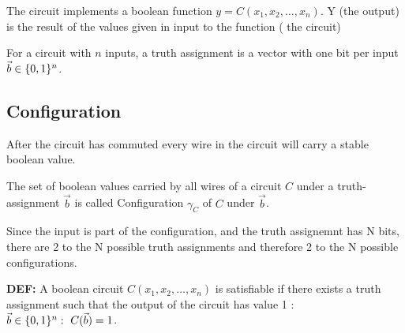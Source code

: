The circuit implements a boolean function $y=C(x_1,x_2,\ldots,x_n)$.
Y (the output) is the result of the values given in input to the function ( the circuit) 

\begin{notesdefinition}
For a circuit with $n$ inputs, a truth assignment is a vector with one bit per input $\vec b\in\{0,1\}^n$.
\end{notesdefinition}

\subsection{Configuration} 

After the circuit has commuted every wire in the circuit will carry a stable boolean value.

\begin{notesdefinition}
The set of boolean values carried by all wires of a circuit $C$ under a truth-assignment $\vec b$ is called Configuration $\gamma_C$ of $C$ under $\vec b$.
\end{notesdefinition}

Since the input is part of the configuration, and the truth assignemnt has N bits, there are 2 to the N possible truth assignments and therefore 2 to the N possible configurations. 

\begin{notesdefinition}
\textbf{DEF:} A boolean circuit $C(x_1,x_2,\ldots,x_n)$ is satisfiable if there exists a truth assignment such that the output of the circuit has value 1 :  $\vec b\in\{0,1\}^n:\ C(\vec b)=1$.
\end{notesdefinition}
